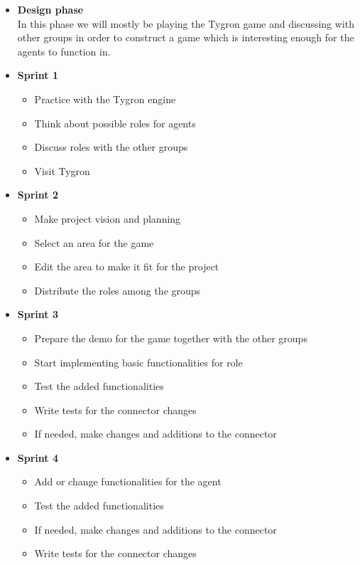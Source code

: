 \begin{itemize}
\item\textbf{Design phase}\\
In this phase we will mostly be playing the Tygron game and discussing with other groups in order to construct a game which is interesting enough for the agents to function in.


\item\textbf{Sprint 1}

\begin{itemize}
  \item Practice with the Tygron engine
  \item Think about possible roles for agents
  \item Discuss roles with the other groups
  \item Visit Tygron
\end{itemize}


\item\textbf{Sprint 2}

\begin{itemize}
  \item Make project vision and planning
  \item Select an area for the game
  \item Edit the area to make it fit for the project
  \item Distribute the roles among the groups
\end{itemize}


\item\textbf{Sprint 3}

\begin{itemize}
  \item Prepare the demo for the game together with the other groups
  \item Start implementing basic functionalities for role
  \item Test the added functionalities
  \item Write tests for the connector changes
  \item If needed, make changes and additions to the connector
\end{itemize}

\newpage
\item\textbf{Sprint 4}

\begin{itemize}
  \item Add or change functionalities for the agent
  \item Test the added functionalities
  \item If needed, make changes and additions to the connector
  \item Write tests for the connector changes
\end{itemize}



\end{itemize}

